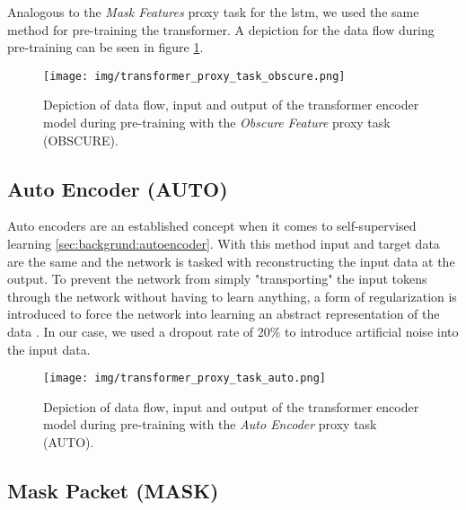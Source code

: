 Analogous to the \textit{Mask Features} proxy task for the \gls{lstm}, we used the same method for pre-training the transformer. A depiction for the data flow during pre-training can be seen in figure \ref{fig:experiments:transformer:obscure}.

\begin{figure}[]
	\centering
	\texttt{[image: img/transformer\_proxy\_task\_obscure.png]}
	\caption{Depiction of data flow, input and output of the transformer encoder model during pre-training with the \textit{Obscure Feature} proxy task (OBSCURE). }
	\label{fig:experiments:transformer:obscure}
\end{figure}

\clearpage

\subsection{Auto Encoder (AUTO)} \label{sec:experiments:transformer:auto_encoder}

Auto encoders are an established concept when it comes to self-supervised learning \ref{sec:backgrund:autoencoder}. With this method input and target data are the same and the network is tasked with reconstructing the input data at the output. To prevent the network from simply "transporting" the input tokens through the network without having to learn anything, a form of regularization is introduced to force the network into learning an abstract representation of the data \cite{autoencoders}. In our case, we used a dropout rate of 20\% to introduce artificial noise into the input data. 

\begin{figure}[h]
	\centering
	\texttt{[image: img/transformer\_proxy\_task\_auto.png]}
	\caption{Depiction of data flow, input and output of the transformer encoder model during pre-training with the \textit{Auto Encoder} proxy task (AUTO). }
	\label{fig:experiments:transformer:auto}
\end{figure}

\subsection{Mask Packet (MASK)} \label{sec:experiments:transformer:mask_packet}


